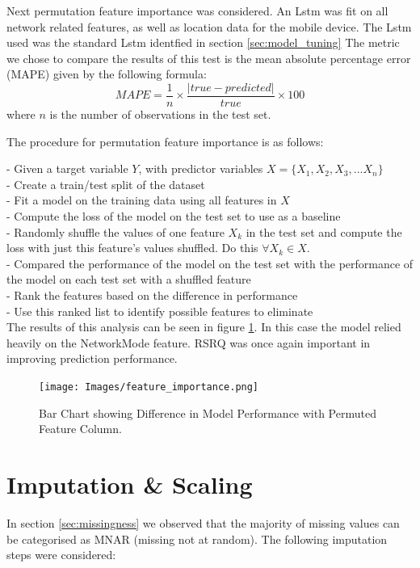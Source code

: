 Next permutation feature importance was considered. An Lstm was fit on all network related features, as well as location data for the mobile device. The Lstm used was the standard Lstm identfied in section \ref{sec:model_tuning} The metric we chose to compare the results of this test is the mean absolute percentage error (MAPE) given by the following formula: \\

\begin{equation}
MAPE = \frac{1}{n} \times \frac{\left|true-predicted\right|}{true} \times 100
\end{equation}
where $n$ is the number of observations in the test set.

The procedure for permutation feature importance is as follows:

- Given a target variable $Y$, with predictor variables $X=\{X_1,X_2,X_3,...X_n\}$ \\
- Create a train/test split of the dataset \\
- Fit a model on the training data using all features in $X$ \\
- Compute the loss of the model on the test set to use as a baseline \\
- Randomly shuffle the values of one feature $X_k$ in the test set and compute the loss with just this feature's values shuffled. Do this $\forall X_k \in X$. \\
- Compared the performance of the model on the test set with the performance of the model on each test set with a shuffled feature \\
- Rank the features based on the difference in performance \\
- Use this ranked list to identify possible features to eliminate \\

The results of this analysis can be seen in figure \ref{fig:feature_importance}. In this case the model relied heavily on the NetworkMode feature. RSRQ was once again important in improving prediction performance. 
\newpage
\begin{figure}[H]
\texttt{[image: Images/feature\_importance.png]}
\centering
\caption{Bar Chart showing Difference in Model Performance with Permuted Feature Column.}
\label{fig:feature_importance}
\end{figure}

\newpage
\section{Imputation \& Scaling}
\label{sec:imputation}
In section \ref{sec:missingness} we observed that the majority of missing values can be categorised as MNAR (missing not at random). The following imputation steps were considered:

